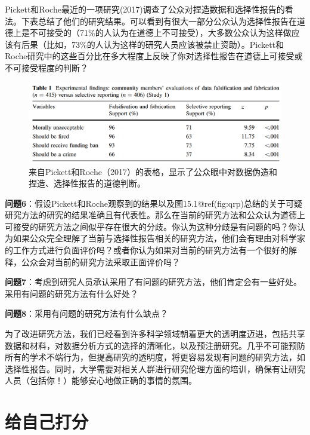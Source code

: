 \documentclass[
  letterpaper,
  DIV=11,
  numbers=noendperiod]{scrreprt}
\begin{document}
Pickett和Roche最近的一项研究(2017)调查了公众对捏造数据和选择性报告的看法。下表总结了他们的研究结果。可以看到有很大一部分公众认为选择性报告在道德上是不可接受的（71\%的人认为在道德上不可接受），大多数公众认为这样做应该有后果（比如，73\%的人认为这样的研究人员应该被禁止资助）。Pickett和Roche研究中的这些百分比在多大程度上反映了你对选择性报告在道德上可接受或不可接受程度的判断？

\begin{figure}

{\centering \includegraphics[width=1\textwidth,height=\textheight]{images/picketroche.png}

}

\caption{\label{fig-pickettroche}来自Pickett和Roche（2017）的表格，显示了公众眼中对数据伪造和捏造、选择性报告的道德判断。}

\end{figure}

\textbf{问题6}：假设Pickett和Roche观察到的结果以及图15.1@ref(fig:qrp)总结的关于可疑研究方法的研究的结果准确且有代表性。那么在当前的研究方法和公众认为道德上可接受的研究方法之间似乎存在很大的分歧。你认为这种分歧是有问题的吗？你认为如果公众完全理解了当前与选择性报告相关的研究方法，他们会有理由对科学家的工作方式进行负面评价吗？或者你认为如果对当前的研究方法有一个很好的解释，公众会对当前的研究方法采取正面评价吗？

\textbf{问题7}：考虑到研究人员承认采用了有问题的研究方法，他们肯定会有一些好处。采用有问题的研究方法有什么好处？

\textbf{问题8}：采用有问题的研究方法有什么缺点？

为了改进研究方法，我们已经看到许多科学领域朝着更大的透明度迈进，包括共享数据和材料，对数据分析方式的选择的清晰化，以及预注册研究。几乎不可能预防所有的学术不端行为，但提高研究的透明度，将更容易发现有问题的研究方法，如选择性报告。同时，大学需要对相关人群进行研究伦理方面的培训，确保有让研究人员（包括你！）能够安心地做正确的事情的氛围。

\hypertarget{ux7ed9ux81eaux5df1ux6253ux5206}{%
\section{给自己打分}\label{ux7ed9ux81eaux5df1ux6253ux5206}}
\end{document}
